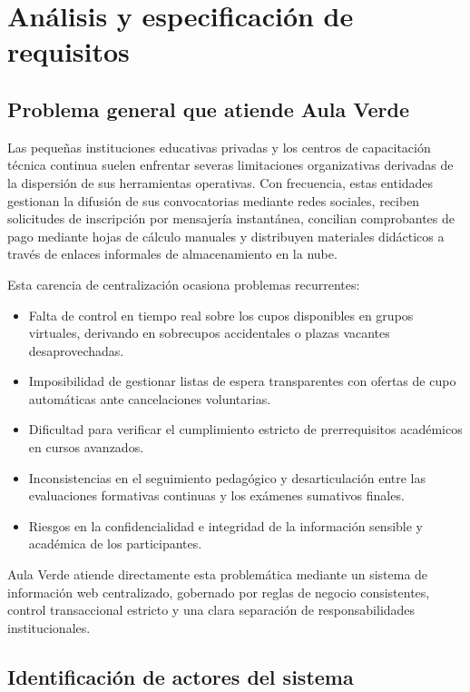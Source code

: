 \section{Análisis y especificación de requisitos}
\label{sec:requisitos}

\subsection{Problema general que atiende Aula Verde}
\label{sec:problema_general}

Las pequeñas instituciones educativas privadas y los centros de capacitación técnica continua suelen enfrentar severas limitaciones organizativas derivadas de la dispersión de sus herramientas operativas. Con frecuencia, estas entidades gestionan la difusión de sus convocatorias mediante redes sociales, reciben solicitudes de inscripción por mensajería instantánea, concilian comprobantes de pago mediante hojas de cálculo manuales y distribuyen materiales didácticos a través de enlaces informales de almacenamiento en la nube.

Esta carencia de centralización ocasiona problemas recurrentes:
\begin{itemize}
    \item Falta de control en tiempo real sobre los cupos disponibles en grupos virtuales, derivando en sobrecupos accidentales o plazas vacantes desaprovechadas.
    \item Imposibilidad de gestionar listas de espera transparentes con ofertas de cupo automáticas ante cancelaciones voluntarias.
    \item Dificultad para verificar el cumplimiento estricto de prerrequisitos académicos en cursos avanzados.
    \item Inconsistencias en el seguimiento pedagógico y desarticulación entre las evaluaciones formativas continuas y los exámenes sumativos finales.
    \item Riesgos en la confidencialidad e integridad de la información sensible y académica de los participantes.
\end{itemize}

Aula Verde atiende directamente esta problemática mediante un sistema de información web centralizado, gobernado por reglas de negocio consistentes, control transaccional estricto y una clara separación de responsabilidades institucionales.

\subsection{Identificación de actores del sistema}
\label{sec:actores_sistema}

